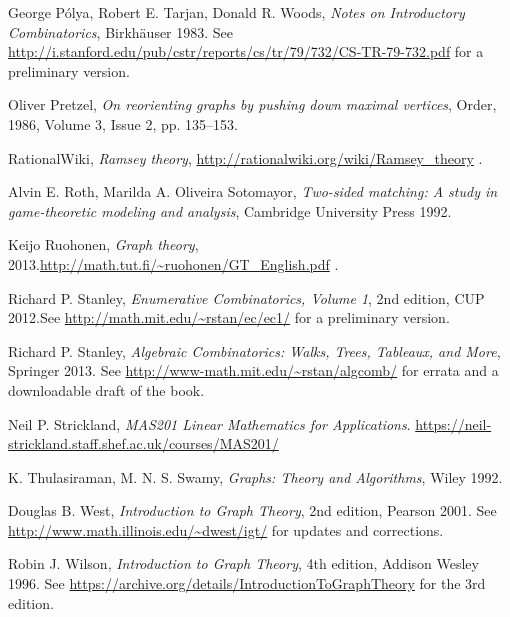\documentclass[numbers=enddot,12pt,final,onecolumn,notitlepage]{scrartcl}%
\theoremstyle{definition}
\begin{document}
\begin{thebibliography}{9999999999}
George P\'olya, Robert E. Tarjan,
Donald R. Woods,
\textit{Notes on Introductory Combinatorics},
Birkh\"auser 1983.
\newline See
\url{http://i.stanford.edu/pub/cstr/reports/cs/tr/79/732/CS-TR-79-732.pdf}
for a preliminary version.

Oliver Pretzel,
\textit{On reorienting graphs by pushing down maximal vertices},
Order, 1986, Volume 3, Issue 2, pp. 135--153.

RationalWiki,
\textit{Ramsey theory},
\url{http://rationalwiki.org/wiki/Ramsey_theory} .

Alvin E. Roth, Marilda A. Oliveira
Sotomayor, \textit{Two-sided matching: A study in game-theoretic
modeling and analysis}, Cambridge University Press 1992.

Keijo Ruohonen, \textit{Graph theory},
2013.\newline \url{http://math.tut.fi/~ruohonen/GT_English.pdf} .

Richard P. Stanley, \textit{Enumerative
Combinatorics, Volume 1}, 2nd edition, CUP 2012.\newline See
\url{http://math.mit.edu/~rstan/ec/ec1/} for a preliminary version.

Richard P. Stanley,
\textit{Algebraic Combinatorics:
Walks, Trees, Tableaux, and More},
Springer 2013.
\newline See \url{http://www-math.mit.edu/~rstan/algcomb/} for errata
and a downloadable draft of the book.

Neil P. Strickland,
\textit{MAS201 Linear Mathematics for Applications}.
\newline \url{https://neil-strickland.staff.shef.ac.uk/courses/MAS201/}

K. Thulasiraman, M. N. S. Swamy,
\textit{Graphs: Theory and Algorithms},
Wiley 1992.

Douglas B. West,
\textit{Introduction to Graph Theory}, 2nd edition, Pearson 2001.
\newline See \url{http://www.math.illinois.edu/~dwest/igt/}
for updates and corrections.

Robin J. Wilson,
\textit{Introduction to Graph Theory}, 4th edition,
Addison Wesley 1996. \newline
See \url{https://archive.org/details/IntroductionToGraphTheory} for
the 3rd edition.

\end{thebibliography}
\end{document}
